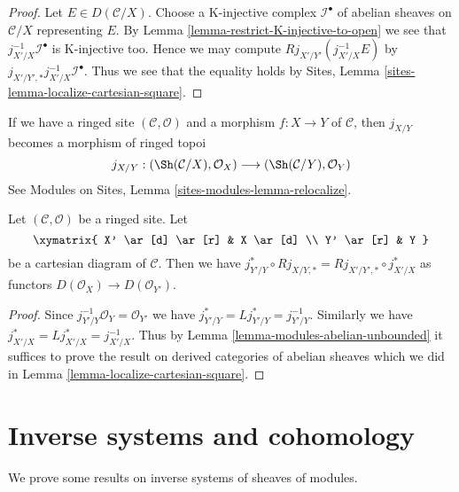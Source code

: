 \begin{proof}
Let $E \in D(\mathcal{C}/X)$. Choose a K-injective complex
$\mathcal{I}^\bullet$ of abelian sheaves on $\mathcal{C}/X$
representing $E$. By Lemma \ref{lemma-restrict-K-injective-to-open}
we see that $j_{X'/X}^{-1}\mathcal{I}^\bullet$ is K-injective too.
Hence we may compute $Rj_{X'/Y'}(j_{X'/X}^{-1}E)$ by
$j_{X'/Y', *}j_{X'/X}^{-1}\mathcal{I}^\bullet$.
Thus we see that the equality holds by
Sites, Lemma \ref{sites-lemma-localize-cartesian-square}.
\end{proof}

\noindent
If we have a ringed site $(\mathcal{C}, \mathcal{O})$
and a morphism $f : X \to Y$ of $\mathcal{C}$, then $j_{X/Y}$
becomes a morphism of ringed topoi
$$
j_{X/Y} :
(\Sh(\mathcal{C}/X), \mathcal{O}_X)
\longrightarrow
(\Sh(\mathcal{C}/Y), \mathcal{O}_Y)
$$
See Modules on Sites, Lemma \ref{sites-modules-lemma-relocalize}.

\begin{lemma}
\label{lemma-localize-cartesian-square-modules}
Let $(\mathcal{C}, \mathcal{O})$ be a ringed site. Let
$$
\xymatrix{
X' \ar[d] \ar[r] & X \ar[d] \\
Y' \ar[r] & Y
}
$$
be a cartesian diagram of $\mathcal{C}$. Then we have
$j_{Y'/Y}^* \circ Rj_{X/Y, *} = Rj_{X'/Y', *} \circ j_{X'/X}^*$
as functors
$D(\mathcal{O}_X) \to D(\mathcal{O}_{Y'})$.
\end{lemma}

\begin{proof}
Since $j_{Y'/Y}^{-1}\mathcal{O}_Y = \mathcal{O}_{Y'}$ we have
$j_{Y'/Y}^* = Lj_{Y'/Y}^* = j_{Y'/Y}^{-1}$. Similarly we have
$j_{X'/X}^* = Lj_{X'/X}^* = j_{X'/X}^{-1}$. Thus by
Lemma \ref{lemma-modules-abelian-unbounded} it suffices
to prove the result on derived categories of abelian sheaves
which we did in
Lemma \ref{lemma-localize-cartesian-square}.
\end{proof}












\section{Inverse systems and cohomology}
\label{section-inverse-systems}

\noindent
We prove some results on inverse systems of sheaves of modules.

